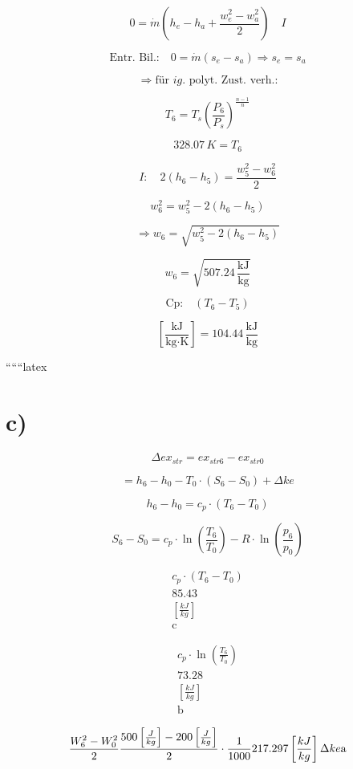 \[
0 = \dot{m} (h_e - h_a + \frac{w_e^2 - w_a^2}{2}) \quad I
\]

\[
\text{Entr. Bil.:} \quad 0 = \dot{m} (s_e - s_a) \Rightarrow s_e = s_a
\]

\[
\Rightarrow \text{für } ig. \text{ polyt. Zust. verh.:}
\]

\[
T_6 = T_s \left( \frac{P_6}{P_s} \right)^{\frac{n-1}{n}}
\]

\[
328.07 \, K = T_6
\]

\[
I: \quad 2 \left( h_6 - h_5 \right) = \frac{w_5^2 - w_6^2}{2}
\]

\[
w_6^2 = w_5^2 - 2 \left( h_6 - h_5 \right)
\]

\[
\Rightarrow w_6 = \sqrt{w_5^2 - 2 \left( h_6 - h_5 \right)}
\]

\[
w_6 = \sqrt{507.24 \, \frac{\text{kJ}}{\text{kg}}}
\]

\[
\text{Cp:} \quad (T_6 - T_5)
\]

\[
\left[ \frac{\text{kJ}}{\text{kg} \cdot \text{K}} \right] = 104.44 \, \frac{\text{kJ}}{\text{kg}}
\]

``````latex


\section*{c)}

\[
\Delta ex_{str} = ex_{str6} - ex_{str0}
\]

\[
= h_6 - h_0 - T_0 \cdot (S_6 - S_0) + \Delta ke
\]

\[
h_6 - h_0 = c_p \cdot (T_6 - T_0)
\]

\[
S_6 - S_0 = c_p \cdot \ln \left( \frac{T_6}{T_0} \right) - R \cdot \ln \left( \frac{p_6}{p_0} \right)
\]

\[
\begin{array}{c}
c_p \cdot (T_6 - T_0) \\
85.43 \\
\left[ \frac{kJ}{kg} \right] \\
\text{c}
\end{array}
\]

\[
\begin{array}{c}
c_p \cdot \ln \left( \frac{T_6}{T_0} \right) \\
73.28 \\
\left[ \frac{kJ}{kg} \right] \\
\text{b}
\end{array}
\]

\[
\frac{W_6^2 - W_0^2}{2} \\
\frac{500 \left[ \frac{J}{kg} \right] - 200 \left[ \frac{J}{kg} \right]}{2} \cdot \frac{1}{1000} \\
217.297 \left[ \frac{kJ}{kg} \right] \\
\Delta ke \\
\text{a}
\]

